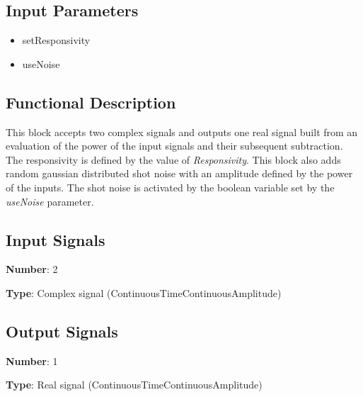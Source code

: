 \documentclass[../../sdf/tex/BPSK_system.tex]{subfiles}
\date{}
\begin{document}
\onlyinsubfile{\maketitle}

\subsection*{Input Parameters}

\begin{multicols}{2}
	\begin{itemize}
		\item setResponsivity
		\item useNoise
	\end{itemize}
\end{multicols}

\subsection*{Functional Description}

This block accepts two complex signals and outputs one real signal built from an evaluation of the power of the input signals and their subsequent subtraction. The responsivity is defined by the value of \textit{Responsivity}. This block also adds random gaussian distributed shot noise with an amplitude defined by the power of the inputs. The shot noise is activated by the boolean variable set by the \textit{useNoise} parameter.

\subsection*{Input Signals}

\textbf{Number}: 2

\textbf{Type}: Complex signal (ContinuousTimeContinuousAmplitude)

\subsection*{Output Signals}

\textbf{Number}: 1

\textbf{Type}: Real signal (ContinuousTimeContinuousAmplitude)
\end{document}
